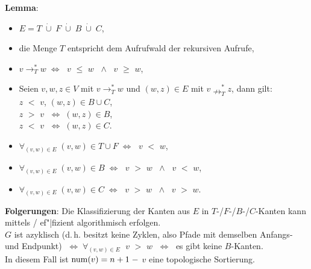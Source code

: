 \textbf{Lemma}:
\begin{itemize}
    \item
    $E = T \;\dot{\cup}\; F \;\dot{\cup}\; B \;\dot{\cup}\; C$,

    \item
    die Menge $T$ entspricht dem Aufrufwald der rekursiven Aufrufe,

    \item
    $v \rightarrow^\ast_T w \;\Leftrightarrow\;$
    \code{dfsnum[}$v$\code{]} $\le$ \code{dfsnum[}$w$\code{]} $\;\land\;$
    \code{compnum[}$v$\code{]} $\ge$ \code{compnum[}$w$\code{]},

    \item
    Seien $v, w, z \in V$ mit $v \rightarrow^\ast_T w$ und
    $(w, z) \in E$ mit $v \nrightarrow^\ast_T z$, dann gilt: \\
    \code{dfsnum[}$z$\code{]} $<$ \code{dfsnum[}$v$\code{]}, \qquad
    $(w, z) \in B \cup C$, \\
    \code{compnum[}$z$\code{]} $>$ \code{compnum[}$v$\code{]}
    $\;\Leftrightarrow\; (w, z) \in B$, \\
    \code{compnum[}$z$\code{]} $<$ \code{compnum[}$v$\code{]}
    $\;\Leftrightarrow\; (w, z) \in C$.

    \item
    $\forall_{(v, w) \in E}\; (v, w) \in T \cup F \;\Leftrightarrow\;$
    \code{dfsnum[}$v$\code{]} $<$ \code{dfsnum[}$w$\code{]},

    \item
    $\forall_{(v, w) \in E}\; (v, w) \in B \;\Leftrightarrow\;$
    \code{dfsnum[}$v$\code{]} $>$ \code{dfsnum[}$w$\code{]} $\;\land\;$
    \code{compnum[}$v$\code{]} $<$ \code{compnum[}$w$\code{]},

    \item
    $\forall_{(v, w) \in E}\; (v, w) \in C \;\Leftrightarrow\;$
    \code{dfsnum[}$v$\code{]} $>$ \code{dfsnum[}$w$\code{]} $\;\land\;$
    \code{compnum[}$v$\code{]} $>$ \code{compnum[}$w$\code{]}.
\end{itemize}

\linie

\textbf{Folgerungen}:
Die Klassifizierung der Kanten aus $E$ in $T$-/$F$-/$B$-/$C$-Kanten kann
mittels / ef"|fizient algorithmisch erfolgen. \\
$G$ ist azyklisch
(d.\,h. besitzt keine Zyklen, also Pfade mit demselben Anfangs- und Endpunkt)
$\;\Leftrightarrow\; \forall_{(v,w) \in E}\;$
\code{compnum[}$v$\code{]} $>$ \code{compnum[}$w$\code{]}
$\;\Leftrightarrow\;$ es gibt keine $B$-Kanten. \\
In diesem Fall ist $\operatorname{num}(v) = n + 1 \;-$ \code{compnum[}$v$\code{]}
eine topologische Sortierung.

